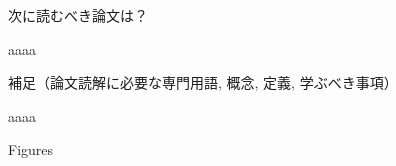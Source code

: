 \documentclass[a4j,11pt,twocolumn,dvipdfmx,platex]{jsarticle}
\begin{document}
\vspace{4mm}
\begin{screen}
	次に読むべき論文は？
\end{screen}
%
aaaa


\vspace{4mm}
\begin{screen}
	補足（論文読解に必要な専門用語, 概念, 定義, 学ぶべき事項）
\end{screen}
%
aaaa




\vspace{4mm}
\noindent
Figures \hrulefill


%
%

\end{document}
